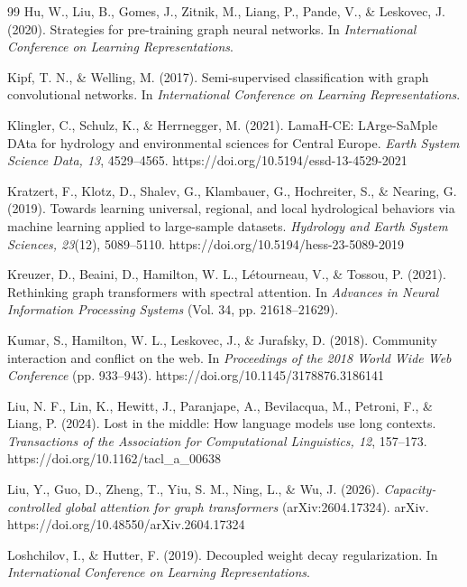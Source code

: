 \begin{thebibliography}{99}
Hu, W., Liu, B., Gomes, J., Zitnik, M., Liang, P., Pande, V., \& Leskovec, J. (2020). Strategies for pre-training graph neural networks. In \emph{International Conference on Learning Representations}.

Kipf, T. N., \& Welling, M. (2017). Semi-supervised classification with graph convolutional networks. In \emph{International Conference on Learning Representations}.

Klingler, C., Schulz, K., \& Herrnegger, M. (2021). LamaH-CE: LArge-SaMple DAta for hydrology and environmental sciences for Central Europe. \emph{Earth System Science Data, 13}, 4529--4565. https://doi.org/10.5194/essd-13-4529-2021

Kratzert, F., Klotz, D., Shalev, G., Klambauer, G., Hochreiter, S., \& Nearing, G. (2019). Towards learning universal, regional, and local hydrological behaviors via machine learning applied to large-sample datasets. \emph{Hydrology and Earth System Sciences, 23}(12), 5089--5110. https://doi.org/10.5194/hess-23-5089-2019

Kreuzer, D., Beaini, D., Hamilton, W. L., L\'{e}tourneau, V., \& Tossou, P. (2021). Rethinking graph transformers with spectral attention. In \emph{Advances in Neural Information Processing Systems} (Vol. 34, pp. 21618--21629).

Kumar, S., Hamilton, W. L., Leskovec, J., \& Jurafsky, D. (2018). Community interaction and conflict on the web. In \emph{Proceedings of the 2018 World Wide Web Conference} (pp. 933--943). https://doi.org/10.1145/3178876.3186141

Liu, N. F., Lin, K., Hewitt, J., Paranjape, A., Bevilacqua, M., Petroni, F., \& Liang, P. (2024). Lost in the middle: How language models use long contexts. \emph{Transactions of the Association for Computational Linguistics, 12}, 157--173. https://doi.org/10.1162/tacl\_a\_00638

Liu, Y., Guo, D., Zheng, T., Yiu, S. M., Ning, L., \& Wu, J. (2026). \emph{Capacity-controlled global attention for graph transformers} (arXiv:2604.17324). arXiv. https://doi.org/10.48550/arXiv.2604.17324

Loshchilov, I., \& Hutter, F. (2019). Decoupled weight decay regularization. In \emph{International Conference on Learning Representations}.


\end{thebibliography}
